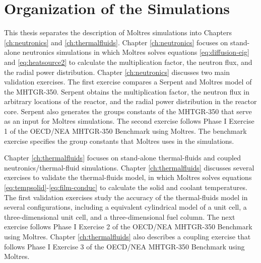 \section{Organization of the Simulations}

This thesis separates the description of Moltres simulations into Chapters \ref{ch:neutronics} and \ref{ch:thermalfluids}.
Chapter \ref{ch:neutronics} focuses on stand-alone neutronics simulations in which Moltres solves equations \ref{eq:diffusion-eig} and \ref{eq:heatsource2} to calculate the multiplication factor, the neutron flux, and the radial power distribution.
Chapter \ref{ch:neutronics} discusses two main validation exercises.
The first exercise compares a Serpent and Moltres model of the MHTGR-350.
Serpent obtains the multiplication factor, the neutron flux in arbitrary locations of the reactor, and the radial power distribution in the reactor core.
Serpent also generates the groups constants of the MHTGR-350 that serve as an input for Moltres simulations.
The second exercise follows Phase I Exercise 1 of the OECD/NEA MHTGR-350 Benchmark using Moltres.
The benchmark exercise specifies the group constants that Moltres uses in the simulations.

Chapter \ref{ch:thermalfluids} focuses on stand-alone thermal-fluids and coupled neutronics/thermal-fluid simulations.
Chapter \ref{ch:thermalfluids} discusses several exercises to validate the thermal-fluids model, in which Moltres solves equations \ref{eq:tempsolid}-\ref{eq:film-conduc} to calculate the solid and coolant temperatures.
The first validation exercises study the accuracy of the thermal-fluids model in several configurations, including a equivalent cylindrical model of a unit cell, a three-dimensional unit cell, and a three-dimensional fuel column.
The next exercise follows Phase I Exercise 2 of the OECD/NEA MHTGR-350 Benchmark using Moltres.
Chapter \ref{ch:thermalfluids} also describes a coupling exercise that follows Phase I Exercise 3 of the OECD/NEA MHTGR-350 Benchmark using Moltres.
